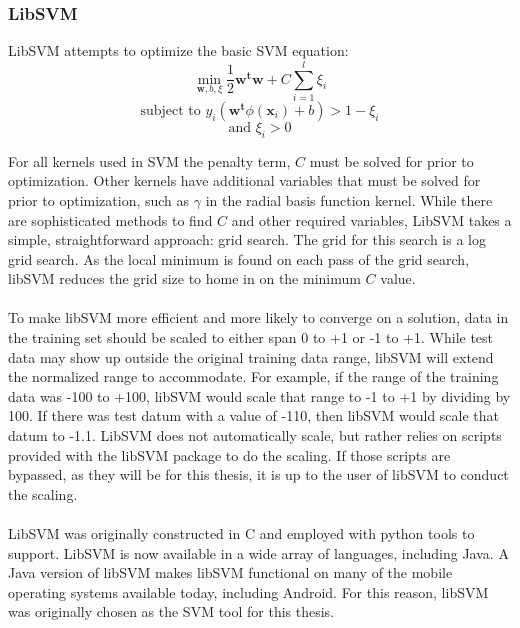 		\subsubsection{LibSVM} LibSVM attempts to optimize the basic SVM equation:
		\begin{equation} \min_{\mathbf{w}, b, \xi} \frac{1}{2} \mathbf{w^t w} + C \sum_{i=1}^{l} \xi_i \end{equation}
		\begin{equation} \text{subject to } y_i( \mathbf{w^t}\phi ( \mathbf{x}_i ) + b ) > 1- \xi_i \end{equation}
		\begin{equation} \text{and } \xi_i > 0\end{equation}

		For all kernels used in SVM the penalty term, $C$ must be solved for prior to optimization.  Other kernels have additional variables that must be solved for prior to optimization, such as $\gamma$ in the radial basis function kernel.  While there are sophisticated methods to find $C$ and other required variables, LibSVM takes a simple, straightforward approach: grid search.  The grid for this search is a log grid search.  As the local minimum is found on each pass of the grid search, libSVM reduces the grid size to home in on the minimum $C$ value.  

			\paragraph{} To make libSVM more efficient and more likely to converge on a solution, data in the training set should be scaled to either span 0 to +1 or -1 to +1.  While test data may show up outside the original training data range, libSVM will extend the normalized range to accommodate.  For example, if the range of the training data was -100 to +100, libSVM would scale that range to -1 to +1 by dividing by 100.  If there was test datum with a value of -110, then libSVM would scale that datum to -1.1.  LibSVM does not automatically scale, but rather relies on scripts provided with the libSVM package to do the scaling.  If those scripts are bypassed, as they will be for this thesis, it is up to the user of libSVM to conduct the scaling.
		
			\paragraph{} LibSVM was originally constructed in C and employed with python tools to support.  LibSVM is now available in a wide array of languages, including Java.  A Java version of libSVM makes libSVM functional on many of the mobile operating systems available today, including Android.  For this reason, libSVM was originally chosen as the SVM tool for this thesis.



